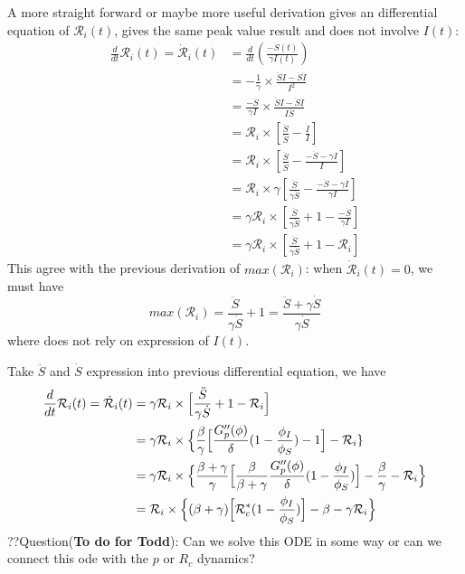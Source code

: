 \documentclass[
]{article}
\begin{document}
A more straight forward or maybe more useful derivation gives an
differential equation of \(\mathcal{R}_i(t)\), gives the same peak value
result and does not involve \(I(t)\): \[\begin{aligned}
\frac{d}{dt}\mathcal{R}_i(t)=\dot{\mathcal{R}}_i(t)&=\frac{d}{dt}(\frac{-\dot{S}(t)}{\gamma I(t)})
\\
& =-\frac{1}{\gamma}\times\frac{\ddot{S}I-\dot{S}\dot{I}}{I^2}
\\
& = \frac{-\dot{S}}{\gamma I} \times \frac{\ddot{S}I-\dot{S}\dot{I}}{I\dot{S}}
\\
& =\mathcal{R}_i \times [\frac{\ddot{S}}{\dot{S}}-\frac{\dot{I}}{I}]
\\
& = \mathcal{R}_i \times [\frac{\ddot{S}}{\dot{S}}-\frac{-\dot{S}-\gamma I}{I}]
\\
& = \mathcal{R}_i \times \gamma [\frac{\ddot{S}}{\gamma\dot{S}}-\frac{-\dot{S}-\gamma I}{\gamma I}]
\\
& = \gamma \mathcal{R}_i \times [\frac{\ddot{S}}{\gamma\dot{S}}+1-\frac{-\dot{S}}{\gamma I}]
\\
& = \gamma \mathcal{R}_i \times [\frac{\ddot{S}}{\gamma\dot{S}}+1-\mathcal{R}_i]
\end{aligned}\] This agree with the previous derivation of
\(max(\mathcal{R}_i)\): when \(\dot{\mathcal{R}}_i(t)=0\), we must have
\[
max(\mathcal{R}_i) =\frac{\ddot{S}}{\gamma\dot{S}}+1=\frac{\ddot{S}+\gamma \dot{S}}{\gamma\dot{S}}
\] where does not rely on expression of \(I(t)\).

Take \(\ddot{S}\) and \(\dot{S}\) expression into previous differential
equation, we have \[\begin{aligned}
\frac{d}{dt}\mathcal{R}_i(t)=\dot{\mathcal{R}}_i(t) & =\gamma \mathcal{R}_i \times \Bigl[\frac{\ddot{S}}{\gamma\dot{S}}+1-\mathcal{R}_i \Bigr]
\\
& =\gamma \mathcal{R}_i \times \Bigl\{\frac{\beta}{\gamma}\Bigl[\frac{G''_p(\phi)}{\delta}(1-\frac{\phi_I}{\phi_S})-1 \Bigr]-\mathcal{R}_i\}
\\
& = \gamma\mathcal{R}_i \times \Big\{\frac{\beta+\gamma}{\gamma}\Big[\frac{\beta}{\beta+\gamma}\frac{G''_p(\phi)}{\delta}(1-\frac{\phi_I}{\phi_S})\Big]-\frac{\beta}{\gamma}-\mathcal{R}_i\Big\}
\\
& = \mathcal{R}_i \times \Big\{(\beta+\gamma)\Big[ \mathcal{R}^*_c (1-\frac{\phi_I}{\phi_S}) \Big]-\beta-\gamma\mathcal{R}_i \Big\}
\end{aligned}\] ??Question(\textbf{To do for Todd}): Can we solve this
ODE in some way or can we connect this ode with the \(p\) or \(R_c\)
dynamics?
\end{document}
